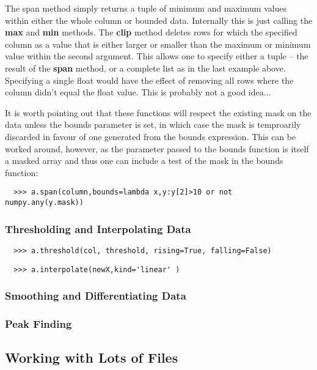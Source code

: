 \documentclass[a4paper,11pt]{scrartcl}
\begin{document}
The span method simply returns a tuple of minimum and maximum values within either the whole column or bounded data. Internally this is just calling the \textbf{max} and \textbf{min} methods. The \textbf{clip} method deletes rows for which the specified column as a value that is either larger or smaller than the maximum or minimum value within the second argument. This allows one to specify either a tuple -- \eg the result of the \textbf{span} method, or a complete list as in the last example above. Specifying a single float would have the effect of removing all rows where the column didn't equal the float value. This is probably not a good idea...

It is worth pointing out that these functions will respect the existing mask on the data unless the bounds parameter is set, in which case the mask is temproarily discarded in favour of one generated from the bounds expression. This can be worked around, however, as the parameter passed to the bounds function is itself a masked array and thus one can include a test of the mask in the bounds function:

\begin{verbatim}
  >>> a.span(column,bounds=lambda x,y:y[2]>10 or not numpy.any(y.mask))
\end{verbatim}

\subsubsection{Thresholding and Interpolating Data}
\begin{verbatim}
  >>> a.threshold(col, threshold, rising=True, falling=False)
\end{verbatim}

\begin{verbatim}
  >>> a.interpolate(newX,kind='linear' )
\end{verbatim}

\subsubsection{Smoothing and Differentiating Data}

\subsubsection{Peak Finding}

\subsection{Working with Lots of Files}
\end{document}
